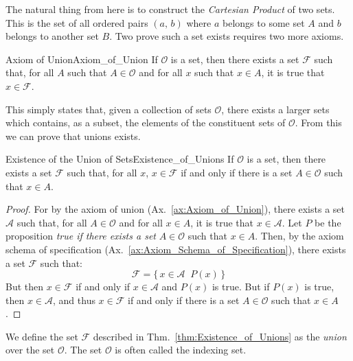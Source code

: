        The natural thing from here is to construct the
        \textit{Cartesian Product} of two sets. This is the set of all ordered
        pairs $(a,\,b)$ where $a$ belongs to some set $A$ and $b$ belongs to
        another set $B$. Two prove such a set exists requires two more axioms.
        \begin{faxiom}{Axiom of Union}{Axiom_of_Union}
            If $\mathcal{O}$ is a set, then there exists a set $\mathcal{F}$
            such that, for all $A$ such that $A\in\mathcal{O}$ and for all
            $x$ such that $x\in{A}$, it is true that $x\in\mathcal{F}$.
        \end{faxiom}
        This simply states that, given a collection of sets $\mathcal{O}$,
        there exists a larger sets which contains, as a subset, the elements
        of the constituent sets of $\mathcal{O}$. From this we can prove that
        unions exists.
        \begin{ltheorem}{Existence of the Union of Sets}{Existence_of_Unions}
            If $\mathcal{O}$ is a set, then there exists a set $\mathcal{F}$
            such that, for all $x$, $x\in\mathcal{F}$ if and only if there is
            a set $A\in\mathcal{O}$ such that $x\in{A}$.
        \end{ltheorem}
        \begin{proof}
            For by the axiom of union (Ax.~\ref{ax:Axiom_of_Union}), there
            exists a set $\mathcal{A}$ such that, for all $A\in\mathcal{O}$
            and for all $x\in{A}$, it is true that $x\in\mathcal{A}$. Let
            $P$ be the proposition \textit{true if there exists a set}
            $A\in\mathcal{O}$ such that $x\in{A}$. Then, by the axiom schema
            of specification (Ax.~\ref{ax:Axiom_Schema_of_Specification}),
            there exists a set $\mathcal{F}$ such that:
            \begin{equation}
                \mathcal{F}=\{\,x\in\mathcal{A}\,\:\,P(x)\,\}
            \end{equation}
            But then $x\in\mathcal{F}$ if and only if $x\in\mathcal{A}$ and
            $P(x)$ is true. But if $P(x)$ is true, then $x\in\mathcal{A}$, and
            thus $x\in\mathcal{F}$ if and only if there is a set
            $A\in\mathcal{O}$ such that $x\in{A}$.
        \end{proof}
        We define the set $\mathcal{F}$ described in
        Thm.~\ref{thm:Existence_of_Unions} as the \textit{union} over the set
        $\mathcal{O}$. The set $\mathcal{O}$ is often called the indexing set.
